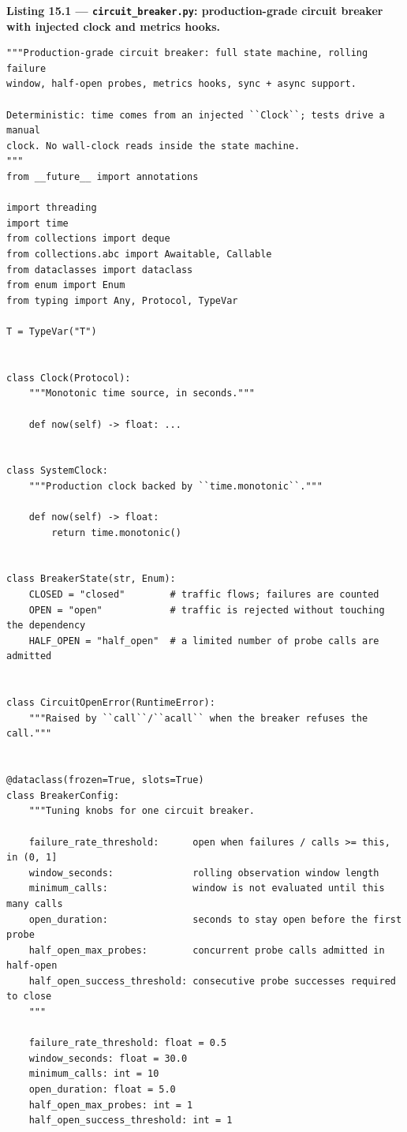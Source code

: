 \noindent\textbf{Listing 15.1 --- \texttt{circuit\_breaker.py}:
production-grade circuit breaker with injected clock and metrics hooks.}
\label{lst:ch15-breaker}
\begin{verbatim}
"""Production-grade circuit breaker: full state machine, rolling failure
window, half-open probes, metrics hooks, sync + async support.

Deterministic: time comes from an injected ``Clock``; tests drive a manual
clock. No wall-clock reads inside the state machine.
"""
from __future__ import annotations

import threading
import time
from collections import deque
from collections.abc import Awaitable, Callable
from dataclasses import dataclass
from enum import Enum
from typing import Any, Protocol, TypeVar

T = TypeVar("T")


class Clock(Protocol):
    """Monotonic time source, in seconds."""

    def now(self) -> float: ...


class SystemClock:
    """Production clock backed by ``time.monotonic``."""

    def now(self) -> float:
        return time.monotonic()


class BreakerState(str, Enum):
    CLOSED = "closed"        # traffic flows; failures are counted
    OPEN = "open"            # traffic is rejected without touching the dependency
    HALF_OPEN = "half_open"  # a limited number of probe calls are admitted


class CircuitOpenError(RuntimeError):
    """Raised by ``call``/``acall`` when the breaker refuses the call."""


@dataclass(frozen=True, slots=True)
class BreakerConfig:
    """Tuning knobs for one circuit breaker.

    failure_rate_threshold:      open when failures / calls >= this, in (0, 1]
    window_seconds:              rolling observation window length
    minimum_calls:               window is not evaluated until this many calls
    open_duration:               seconds to stay open before the first probe
    half_open_max_probes:        concurrent probe calls admitted in half-open
    half_open_success_threshold: consecutive probe successes required to close
    """

    failure_rate_threshold: float = 0.5
    window_seconds: float = 30.0
    minimum_calls: int = 10
    open_duration: float = 5.0
    half_open_max_probes: int = 1
    half_open_success_threshold: int = 1


\end{verbatim}
